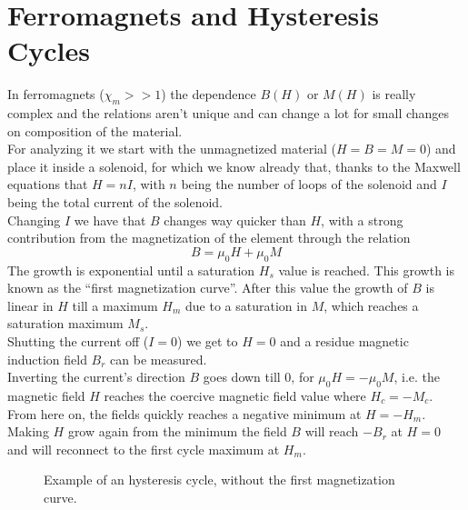 \documentclass[../electromagnetism.tex]{subfiles}
\begin{document}
\section{Ferromagnets and Hysteresis Cycles}
In ferromagnets ($\chi_m>>1$) the dependence $B(H)$ or $M(H)$ is really complex and the relations aren't unique and can change a lot for small changes on composition of the material.\\
For analyzing it we start with the unmagnetized material ($H=B=M=0$) and place it inside a solenoid, for which we know already that, thanks to the Maxwell equations that $H=nI$, with $n$ being the number of loops of the solenoid and $I$ being the total current of the solenoid.\\
Changing $I$ we have that $B$ changes way quicker than $H$, with a strong contribution from the magnetization of the element through the relation
\begin{equation*}
	B=\mu_0H+\mu_0M
\end{equation*}
The growth is exponential until a saturation $H_s$ value is reached. This growth is known as the ``first magnetization curve''. After this value the growth of $B$ is linear in $H$ till a maximum $H_m$ due to a saturation in $M$, which reaches a saturation maximum $M_s$.\\
Shutting the current off ($I=0$) we get to $H=0$ and a residue magnetic induction field $B_r$ can be measured.\\
Inverting the current's direction $B$ goes down till $0$, for $\mu_0H=-\mu_0M$, i.e. the magnetic field $H$ reaches the coercive magnetic field value where $H_c=-M_c$. From here on, the fields quickly reaches a negative minimum at $H=-H_m$.\\
Making $H$ grow again from the minimum the field $B$ will reach $-B_r$ at $H=0$ and will reconnect to the first cycle maximum at $H_m$.\\
\begin{figure}[H]
	\centering
		\caption{Example of an hysteresis cycle, without the first magnetization curve.}
	\label{fig:hysteresis}
\end{figure}
\end{document}
